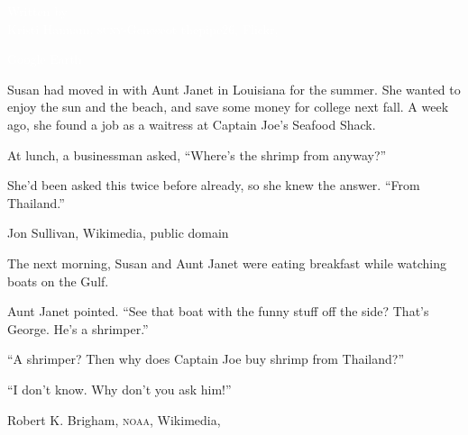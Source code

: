 \documentclass[t]{beamer}
\begin{document}


{
\begin{frame}[b]

	\textcolor{white}{\tiny Written by\\[-3pt] \small Kristi Hannam, \textsc{suny}-Geneseot \hfill \tiny thepipe26, Flickr, }

\end{frame}
}
%
{
\begin{frame}[b]

	\hfill \tiny \textcolor{white}{Google Earth}

\end{frame}
}
%
{
\begin{frame}[t]

	\vspace*{2\baselineskip}
	
	\hspace*{60mm}\parbox{55mm}{%
		\raggedright Susan had moved in with Aunt Janet in Louisiana for the summer. She wanted to enjoy the sun and the beach, and save some money for college next fall. A week ago, she found a job as a waitress at Captain Joe’s Seafood Shack.\vspace*{\baselineskip}

At lunch, a businessman asked, “Where’s the shrimp from anyway?” \vspace*{\baselineskip}

She’d been asked this twice before already, so she knew the answer. “From Thailand.”}

\vfilll

\hfill \tiny Jon Sullivan, Wikimedia, public domain
\end{frame}
}
%
{
\begin{frame}[t]

	\vspace*{1\baselineskip}
	
	\hangpara \parbox{54mm}{%
		\raggedright The next morning, Susan and Aunt Janet 
		were eating breakfast while watching boats on the Gulf.\vspace*{\baselineskip}

		Aunt Janet pointed. “See that boat with the funny stuff 
		off the side? That’s George. He’s a shrimper.”\vspace*{\baselineskip}

		“A shrimper? Then why does Captain Joe buy shrimp from Thailand?”\vspace*{\baselineskip}
	
		“I don’t know. Why don’t you ask him!”
	}

	\vfilll

	\hfill \tiny Robert K. Brigham, \textsc{noaa}, Wikimedia, 
\end{frame}
}
\end{document}
